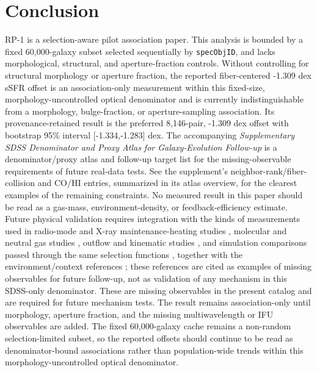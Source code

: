 \documentclass[twocolumn]{aastex631}
\begin{document}
\section{Conclusion}
RP-1 is a selection-aware pilot association paper. This analysis is bounded by a fixed 60,000-galaxy subset selected sequentially by \texttt{specObjID}, and lacks morphological, structural, and aperture-fraction controls. Without controlling for structural morphology or aperture fraction, the reported fiber-centered -1.309 dex sSFR offset is an association-only measurement within this fixed-size, morphology-uncontrolled optical denominator and is currently indistinguishable from a morphology, bulge-fraction, or aperture-sampling association. Its provenance-retained result is the preferred 8,146-pair, -1.309 dex offset with bootstrap 95\% interval [-1.334,-1.283] dex. The accompanying \emph{Supplementary SDSS Denominator and Proxy Atlas for Galaxy-Evolution Follow-up} is a denominator/proxy atlas and follow-up target list for the missing-observable requirements of future real-data tests. See the supplement's neighbor-rank/fiber-collision and CO/HI entries, summarized in its atlas overview, for the clearest examples of the remaining constraints. No measured result in this paper should be read as a gas-mass, environment-density, or feedback-efficiency estimate.
Future physical validation requires integration with the kinds of measurements used in radio-mode and X-ray maintenance-heating studies \citep{best2005,fabian2012,mcnamara2007,heckmanbest2014,lamassa2013}, molecular and neutral gas studies \citep{xcoldgass2017,xgass2018}, outflow and kinematic studies \citep{veilleux2005,cicone2014,carniani2017,fiore2017}, and simulation comparisons passed through the same selection functions \citep{simba2019,tng2019,eagle2015}, together with the environment/context references \citep{peng2010,ellison2011,piotrowska2022,wetzel2013,dekel2006}; these references are cited as examples of missing observables for future follow-up, not as validation of any mechanism in this SDSS-only denominator. These are missing observables in the present catalog and are required for future mechanism tests. The result remains association-only until morphology, aperture fraction, and the missing multiwavelength or IFU observables are added. The fixed 60,000-galaxy cache remains a non-random selection-limited subset, so the reported offsets should continue to be read as denominator-bound associations rather than population-wide trends within this morphology-uncontrolled optical denominator.
\end{document}
